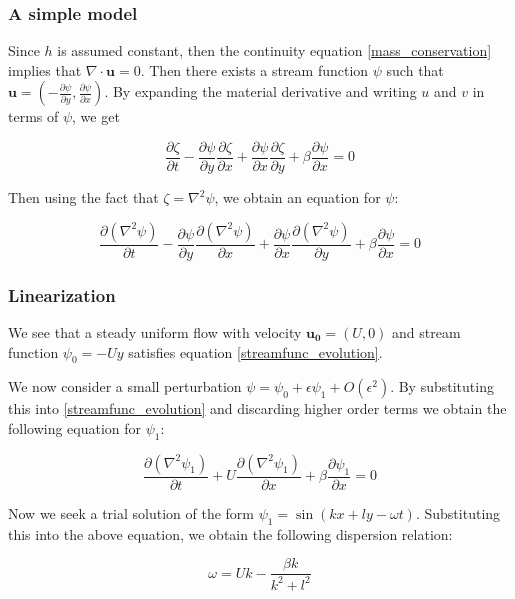 \documentclass[12pt]{beamer}
\begin{document}
\begin{frame}[fragile]
\frametitle{A simple model}

Since $h$ is assumed constant, then the continuity equation \eqref{mass_conservation} implies that $\nabla \cdot \mathbf{u}=0$. Then there exists a stream function $\psi$ such that $\mathbf{u}=\left(-\frac{\partial \psi}{\partial y},\frac{\partial \psi}{\partial x}\right)$. By expanding the material derivative and writing $u$ and $v$ in terms of $\psi$, we get 

\[
\frac{\partial \zeta}{\partial t}-\frac{\partial \psi}{\partial y}\frac{\partial \zeta}{\partial x}+\frac{\partial \psi}{\partial x}\frac{\partial \zeta}{\partial y}+\beta\frac{\partial \psi}{\partial x}=0
\]

Then using the fact that $\zeta=\nabla^2\psi$, we obtain an equation for $\psi$:

\begin{equation}
\frac{\partial \left(\nabla^2 \psi\right)}{\partial t}-\frac{\partial \psi}{\partial y}\frac{\partial \left(\nabla^2 \psi\right)}{\partial x}+\frac{\partial \psi}{\partial x}\frac{\partial \left(\nabla^2 \psi\right)}{\partial y}+\beta\frac{\partial \psi}{\partial x}=0 \label{streamfunc_evolution}
\end{equation}
\end{frame}


\begin{frame}[fragile]
\frametitle{Linearization}
We see that a steady uniform flow with velocity $\mathbf{u_0}=\left(U,0\right)$ and stream function $\psi_0=-Uy$ satisfies equation \eqref{streamfunc_evolution}. 

We now consider a small perturbation $\psi=\psi_0+\epsilon\psi_1+O\left(\epsilon^2\right)$. By substituting this into \eqref{streamfunc_evolution} and discarding higher order terms we obtain the following equation for $\psi_1$:

\[
\frac{\partial \left(\nabla^2 \psi_1\right)}{\partial t}+U\frac{\partial \left(\nabla^2 \psi_1\right)}{\partial x}+\beta\frac{\partial \psi_1}{\partial x}=0
\]

Now we seek a trial solution of the form $\psi_1=\sin\left(kx+ly-\omega t\right)$. Substituting this into the above equation, we obtain the following dispersion relation:

\[
\omega=Uk-\frac{\beta k}{k^2+l^2}
\]

\end{frame}
\end{document}
